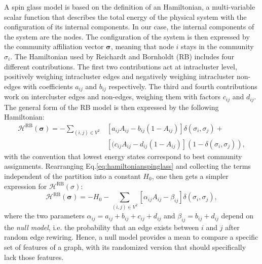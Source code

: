 A spin glass model is based on the definition of an Hamiltonian, a multi-variable scalar function that describes the total energy of the physical system with the configuration of its internal components.
In our case, the internal components of the system are the nodes. The configuration of the system is then expressed by the community affiliation vector $\boldsymbol\sigma$, meaning that node $i$ stays in the community $\sigma_i$.
The Hamiltonian used by Reichardt and Bornholdt (RB) includes four different contributions. The first two contributions act at intracluster level, positively weighing intracluster edges and negatively weighing intracluster non-edges with coefficients $a_{ij}$ and $b_{ij}$ respectively. The third and fourth contributions work on intercluster edges and non-edges, weighing them with factors $c_{ij}$ and $d_{ij}$. The general form of the RB model is then expressed by the following Hamiltonian:
\begin{align}\label{eq:hamiltonianspinglass}
\mathcal{H}^{\textrm{RB}}(\boldsymbol \sigma) = - \sum_{(i,j)\in V^2} & \left[ a_{ij} A_{ij} - b_{ij}(1-A_{ij}) \right] \delta(\sigma_i,\sigma_j) + \nonumber \\ &  \left[ (c_{ij} A_{ij} - d_{ij}(1-A_{ij}) \right] (1-\delta(\sigma_i,\sigma_j)),
\end{align}
with the convention that lowest energy states correspond to best community assignments.
Rearranging Eq.\ref{eq:hamiltonianspinglass} and collecting the terms independent of the partition into a constant $H_0$, one then gets a simpler expression for $\mathcal{H}^{\textrm{RB}}(\sigma)$:
\begin{equation}\label{eq:rbspinglass}
\mathcal{H}^{\textrm{RB}}(\boldsymbol \sigma) = -H_0 - \sum \limits_{(i,j)\in V^2} \left[ \alpha_{ij} A_{ij} - \beta_{ij} \right] \delta(\sigma_i,\sigma_j),
\end{equation}
where the two parameters $\alpha_{ij}=a_{ij}+b_{ij}+c_{ij}+d_{ij}$ and $\beta_{ij}=b_{ij}+d_{ij}$ depend on the \emph{null model}, i.e. the probability that an edge exists between $i$ and $j$ after random edge rewiring. Hence, a null model provides a mean to compare a specific set of features of a graph, with its randomized version that should specifically lack those features.

